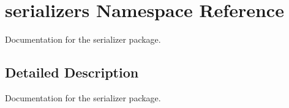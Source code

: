 \hypertarget{namespaceserializers}{}\section{serializers Namespace Reference}
\label{namespaceserializers}


Documentation for the serializer package.  




\subsection{Detailed Description}
Documentation for the serializer package. 
